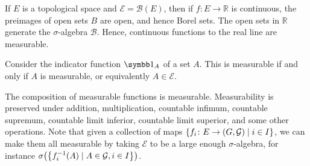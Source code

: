 If \( E \) is a topological space and \( \mathcal E = \mathcal B(E) \), then if \( f \colon E \to \mathbb R \) is continuous, the preimages of open sets \( B \) are open, and hence Borel sets.
The open sets in \( \mathbb R \) generate the \( \sigma \)-algebra \( \mathcal B \).
Hence, continuous functions to the real line are measurable.
\begin{example}
	Consider the indicator function \( \symbb 1_A \) of a set \( A \).
	This is measurable if and only if \( A \) is measurable, or equivalently \( A \in \mathcal E \).
\end{example}
\begin{example}
	The composition of measurable functions is measurable.
	Measurability is preserved under addition, multiplication, countable infimum, countable supremum, countable limit inferior, countable limit superior, and some other operations.
	Note that given a collection of maps \( \qty{f_i \colon E \to (G,\mathcal G) \mid i \in I} \), we can make them all measurable by taking \( \mathcal E \) to be a large enough \( \sigma \)-algebra, for instance \( \sigma\qty(\qty{f_i^{-1}(A) \mid A \in \mathcal G, i \in I}) \).
\end{example}

